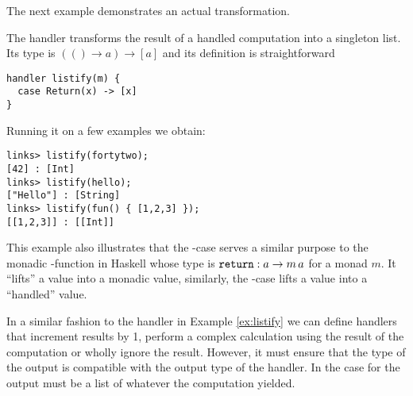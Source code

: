 The next example demonstrates an actual transformation.
\begin{example}\label{ex:listify}
The  handler transforms the result of a handled computation into a singleton list. Its type is $ (() \to a) \to [a]$ and its definition is straightforward
\begin{lstlisting}[style=links]
handler listify(m) {
  case Return(x) -> [x]
}
\end{lstlisting}
Running it on a few examples we obtain:
\begin{lstlisting}[style=links]
links> listify(fortytwo);
[42] : [Int]
links> listify(hello);
["Hello"] : [String]
links> listify(fun() { [1,2,3] });
[[1,2,3]] : [[Int]]
\end{lstlisting}
This example also illustrates that the -case serves a similar purpose to the monadic -function in Haskell whose type is $\texttt{return} : a \to m\, a$ for a monad $m$. It ``lifts'' a value into a monadic value, similarly, the -case lifts a value into a ``handled'' value.
\end{example}

In a similar fashion to the handler  in Example \ref{ex:listify} we can define handlers that increment results by 1, perform a complex calculation using the result of the computation or wholly ignore the result. However, it must ensure that the type of the output is compatible with the output type of the handler. In the case for  the output must be a list of whatever the computation yielded.

